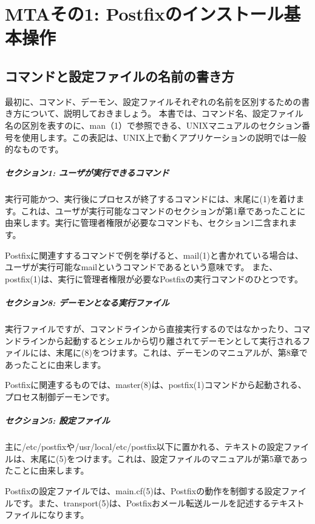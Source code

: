 \chapter{MTAその1: Postfixのインストール基本操作}

\section{コマンドと設定ファイルの名前の書き方}
最初に、コマンド、デーモン、設定ファイルそれぞれの名前を区別するための書き方について、説明しておきましょう。
本書では、コマンド名、設定ファイル名の区別を表すのに、man（1）で参照できる、UNIXマニュアルのセクション番号を使用します。この表記は、UNIX上で動くアプリケーションの説明では一般的なものです。

\paragraph{セクション1: ユーザが実行できるコマンド}
実行可能かつ、実行後にプロセスが終了するコマンドには、末尾に(1)を着けます。これは、ユーザが実行可能なコマンドのセクションが第1章であったことに由来します。実行に管理者権限が必要なコマンドも、セクション1二含まれます。

Postfixに関連すするコマンドで例を挙げると、mail(1)と書かれている場合は、ユーザが実行可能なmailというコマンドであるという意味です。
また、postfix(1)は、実行に管理者権限が必要なPostfixの実行コマンドのひとつです。

\paragraph{セクション8: デーモンとなる実行ファイル}
実行ファイルですが、コマンドラインから直接実行するのではなかったり、コマンドラインから起動するとシェルから切り離されてデーモンとして実行されるファイルには、末尾に(8)をつけます。これは、デーモンのマニュアルが、第8章であったことに由来します。

Postfixに関連するものでは、master(8)は、postfix(1)コマンドから起動される、プロセス制御デーモンです。

\paragraph{セクション5: 設定ファイル}
主に/etc/postfixや/usr/local/etc/postfix以下に置かれる、テキストの設定ファイルは、末尾に(5)をつけます。これは、設定ファイルのマニュアルが第5章であったことに由来します。

Postfixの設定ファイルでは、main.cf(5)は、Postfixの動作を制御する設定ファイルです。また、transport(5)は、Postfixおメール転送ルールを記述するテキストファイルになります。

